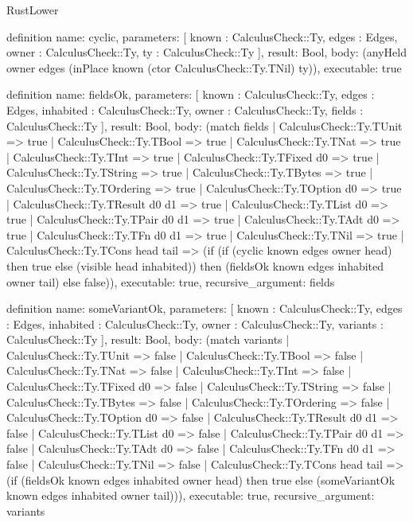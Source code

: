 \begin{lexlean}{RustLower}
\begin{semanticmodule}
definition{
  name: cyclic,
  parameters: [
    known : CalculusCheck::Ty,
    edges : Edges,
    owner : CalculusCheck::Ty,
    ty : CalculusCheck::Ty
  ],
  result: Bool,
  body: (anyHeld owner edges (inPlace known (ctor CalculusCheck::Ty.TNil) ty)),
  executable: true
}

definition{
  name: fieldsOk,
  parameters: [
    known : CalculusCheck::Ty,
    edges : Edges,
    inhabited : CalculusCheck::Ty,
    owner : CalculusCheck::Ty,
    fields : CalculusCheck::Ty
  ],
  result: Bool,
  body: (match fields
    | CalculusCheck::Ty.TUnit => true
    | CalculusCheck::Ty.TBool => true
    | CalculusCheck::Ty.TNat => true
    | CalculusCheck::Ty.TInt => true
    | CalculusCheck::Ty.TFixed d0 => true
    | CalculusCheck::Ty.TString => true
    | CalculusCheck::Ty.TBytes => true
    | CalculusCheck::Ty.TOrdering => true
    | CalculusCheck::Ty.TOption d0 => true
    | CalculusCheck::Ty.TResult d0 d1 => true
    | CalculusCheck::Ty.TList d0 => true
    | CalculusCheck::Ty.TPair d0 d1 => true
    | CalculusCheck::Ty.TAdt d0 => true
    | CalculusCheck::Ty.TFn d0 d1 => true
    | CalculusCheck::Ty.TNil => true
    | CalculusCheck::Ty.TCons head tail => (if (if (cyclic known edges owner head) then true else (visible head inhabited)) then (fieldsOk known edges inhabited owner tail) else false)),
  executable: true,
  recursive_argument: fields
}

definition{
  name: someVariantOk,
  parameters: [
    known : CalculusCheck::Ty,
    edges : Edges,
    inhabited : CalculusCheck::Ty,
    owner : CalculusCheck::Ty,
    variants : CalculusCheck::Ty
  ],
  result: Bool,
  body: (match variants
    | CalculusCheck::Ty.TUnit => false
    | CalculusCheck::Ty.TBool => false
    | CalculusCheck::Ty.TNat => false
    | CalculusCheck::Ty.TInt => false
    | CalculusCheck::Ty.TFixed d0 => false
    | CalculusCheck::Ty.TString => false
    | CalculusCheck::Ty.TBytes => false
    | CalculusCheck::Ty.TOrdering => false
    | CalculusCheck::Ty.TOption d0 => false
    | CalculusCheck::Ty.TResult d0 d1 => false
    | CalculusCheck::Ty.TList d0 => false
    | CalculusCheck::Ty.TPair d0 d1 => false
    | CalculusCheck::Ty.TAdt d0 => false
    | CalculusCheck::Ty.TFn d0 d1 => false
    | CalculusCheck::Ty.TNil => false
    | CalculusCheck::Ty.TCons head tail => (if (fieldsOk known edges inhabited owner head) then true else (someVariantOk known edges inhabited owner tail))),
  executable: true,
  recursive_argument: variants
}


\end{semanticmodule}
\end{lexlean}
